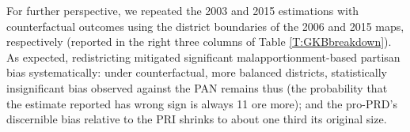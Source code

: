 \documentclass[letter,12pt]{article}
\let\footnote=\endnote
\begin{document}
{For further perspective, we repeated the 2003 and 2015 estimations with counterfactual outcomes using the district boundaries of the 2006 and 2015 maps, respectively (reported in the right three columns of Table \ref{T:GKBbreakdown}). As expected, redistricting mitigated significant malapportionment-based partisan bias systematically: under counterfactual, more balanced districts, statistically insignificant bias observed against the PAN remains thus (the probability that the estimate reported has wrong sign is always 11 ore more); and the pro-PRD's discernible bias relative to the PRI shrinks to about one third its original size.  


}
\end{document}
